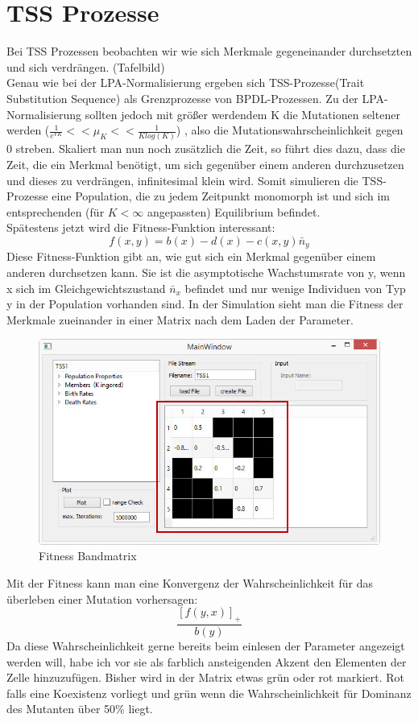\documentclass[11pt, a4paper, german]{article}
\begin{document}
\clearpage
\section{TSS Prozesse}
Bei TSS Prozessen beobachten wir wie sich Merkmale gegeneinander durchsetzten und sich verdrängen. (Tafelbild)\\
Genau wie bei der LPA-Normalisierung ergeben sich TSS-Prozesse(Trait Substitution Sequence) als Grenzprozesse von BPDL-Prozessen. Zu der LPA-Normalisierung sollten jedoch mit größer werdendem K die Mutationen seltener werden ($ \frac{1}{e^{VK}} << \mu_K << \frac{1}{K log(K)} $) , also die Mutationswahrscheinlichkeit gegen 0 streben. Skaliert man nun noch zusätzlich die Zeit, so führt dies dazu, dass die Zeit, die ein Merkmal benötigt, um sich gegenüber einem anderen durchzusetzen und dieses zu verdrängen, infinitesimal klein wird. Somit simulieren die TSS-Prozesse eine Population, die zu jedem Zeitpunkt monomorph ist und sich im entsprechenden (für $ K < \infty $ angepassten) Equilibrium befindet.\\
Spätestens jetzt wird die Fitness-Funktion interessant:
\[ f(x,y) = b(x) - d(x) - c(x,y)\bar{n}_y \]
Diese Fitness-Funktion gibt an, wie gut sich ein Merkmal gegenüber einem anderen durchsetzen kann. Sie ist die asymptotische Wachstumsrate von y, wenn x sich im Gleichgewichtszustand $ \bar{n}_x $ befindet und nur wenige Individuen von Typ y in der Population vorhanden sind. In der Simulation sieht man die Fitness der Merkmale zueinander in einer Matrix nach dem Laden der Parameter.
\begin{figure}[H]
	\centering
	\includegraphics[width=0.7\linewidth]{./Pictures/MainWindow_BandMatrix}
	\caption[Fitness Matrix]{Fitness Bandmatrix}
	\label{MainWindow mit Fitness Bandmatrix}
\end{figure}
Mit der Fitness kann man eine Konvergenz der Wahrscheinlichkeit für das überleben einer Mutation vorhersagen:
\[ \frac{\left[ f(y,x)\right]_+ }{b(y)} \]
Da diese Wahrscheinlichkeit gerne bereits beim einlesen der Parameter angezeigt werden will, habe ich vor sie als farblich ansteigenden Akzent den Elementen der Zelle hinzuzufügen. Bisher wird in der Matrix etwas grün oder rot markiert. Rot falls eine Koexistenz vorliegt und grün wenn die Wahrscheinlichkeit für Dominanz des Mutanten über 50\% liegt.
\end{document}
